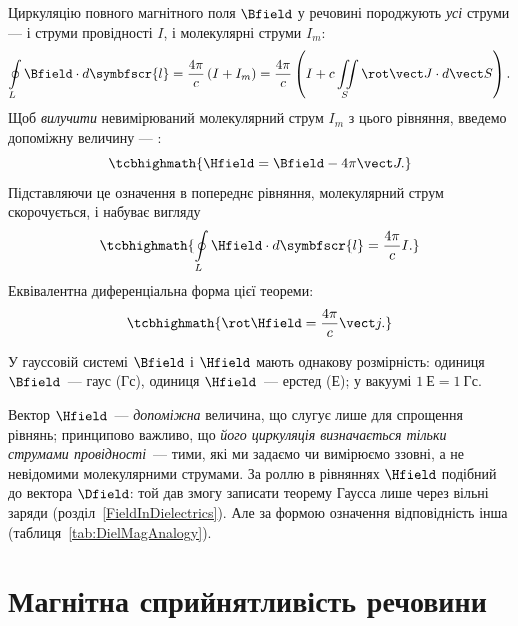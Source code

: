 Циркуляцію повного магнітного поля $\Bfield$ у речовині породжують \emph{усі} струми --- і струми провідності $I$, і молекулярні струми $I_m$:
\begin{equation*}
	\oint\limits_L \Bfield\cdot d\symbfscr{l} = \frac{4\pi}c\left(I + I_m\right) = \frac{4\pi}c\left(I + c\iint\limits_S \rot\vect J\cdot d\vect
	S\right).
\end{equation*}
Щоб \emph{вилучити} невимірюваний молекулярний струм $I_m$ з цього рівняння, введемо допоміжну величину --- :
\begin{equation}\label{eq:HDef}
	\tcbhighmath{
		\Hfield = \Bfield - 4\pi\vect J.
	}
\end{equation}
Підставляючи це означення в попереднє рівняння, молекулярний струм скорочується, і  набуває вигляду
\begin{equation}\label{eq:CirculationHInt}
	\tcbhighmath{
		\oint\limits_L \Hfield\cdot d\symbfscr{l} = \frac{4\pi}c I.
	}
\end{equation}
Еквівалентна диференціальна форма цієї теореми:
\begin{equation}\label{eq:CirculationHDiff}
	\tcbhighmath{
		\rot\Hfield = \frac{4\pi}c\vect j.
	}
\end{equation}

У гауссовій системі $\Bfield$ і $\Hfield$ мають однакову розмірність: одиниця $\Bfield$~--- гаус (Гс), одиниця $\Hfield$~--- ерстед (Е); у вакуумі $1~\text{Е}=1~\text{Гс}$.

\begin{Attention}[unbreakable]
	Вектор $\Hfield$~--- \emph{допоміжна} величина, що слугує лише для спрощення рівнянь; принципово важливо, що \emph{його циркуляція визначається тільки струмами провідності}~--- тими, які ми задаємо чи вимірюємо ззовні, а не невідомими молекулярними струмами. За роллю в рівняннях $\Hfield$ подібний до вектора $\Dfield$: той дав змогу записати теорему Гаусса лише через вільні заряди (розділ~\ref{FieldInDielectrics}). Але за формою означення відповідність інша (таблиця~\ref{tab:DielMagAnalogy}).
\end{Attention}

\section{Магнітна сприйнятливість речовини}\hypertarget{magnetic-susceptibility}{}


